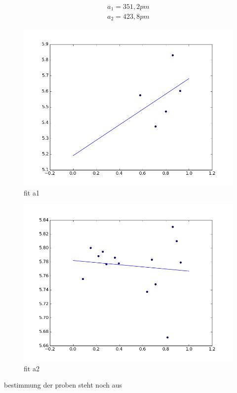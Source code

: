 \begin{align}
 a_1 = 351,2 pm\\
 a_2 = 423,8 pm
\end{align}


\begin{figure}
 \includegraphics[width=\textwidth]{../auswertung/a1.png}
 \caption{fit a1}
 \label{pic:fita1}
\end{figure}

\begin{figure}
 \includegraphics[width=\textwidth]{../auswertung/a2.png}
 \caption{fit a2}
 \label{pic:fita2}
\end{figure}

bestimmung der proben steht noch aus










